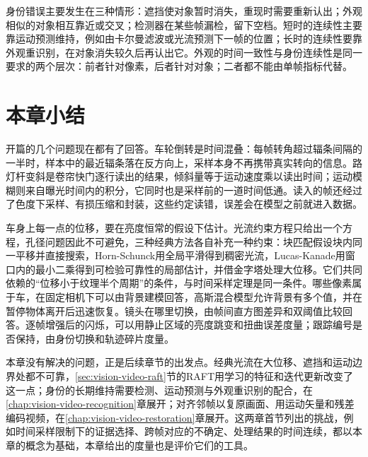身份错误主要发生在三种情形：遮挡使对象暂时消失，重现时需要重新认出；外观相似的对象相互靠近或交叉；检测器在某些帧漏检，留下空档。短时的连续性主要靠运动预测维持，例如由卡尔曼滤波或光流预测下一帧的位置；长时的连续性要靠外观重识别，在对象消失较久后再认出它。外观的时间一致性与身份连续性是同一要求的两个层次：前者针对像素，后者针对对象；二者都不能由单帧指标代替。

\section{本章小结}
\label{sec:vision-videofound-summary}

开篇的几个问题现在都有了回答。车轮倒转是时间混叠：每帧转角超过辐条间隔的一半时，样本中的最近辐条落在反方向上，采样本身不再携带真实转向的信息。路灯杆变斜是卷帘快门逐行读出的结果，倾斜量等于运动速度乘以读出时间；运动模糊则来自曝光时间内的积分，它同时也是采样前的一道时间低通。读入的帧还经过了色度下采样、有损压缩和封装，这些约定读错，误差会在模型之前就进入数据。

车身上每一点的位移，要在亮度恒常的假设下估计。光流约束方程只给出一个方程，孔径问题因此不可避免，三种经典方法各自补充一种约束：块匹配假设块内同一平移并直接搜索，Horn-Schunck用全局平滑得到稠密光流，Lucas-Kanade用窗口内的最小二乘得到可检验可靠性的局部估计，并借金字塔处理大位移。它们共同依赖的“位移小于纹理半个周期”的条件，与时间采样定理是同一条件。哪些像素属于车，在固定相机下可以由背景建模回答，高斯混合模型允许背景有多个值，并在暂停物体离开后迅速恢复。镜头在哪里切换，由帧间直方图差异和双阈值比较回答。逐帧增强后的闪烁，可以用静止区域的亮度跳变和扭曲误差度量；跟踪编号是否保持，由身份切换和轨迹碎片度量。

本章没有解决的问题，正是后续章节的出发点。经典光流在大位移、遮挡和运动边界处都不可靠，\ref{sec:vision-video-raft}节的RAFT用学习的特征和迭代更新改变了这一点；身份的长期维持需要检测、运动预测与外观重识别的配合，在\ref{chap:vision-video-recognition}章展开；对齐邻帧以复原画面、用运动矢量和残差编码视频，在\ref{chap:vision-video-restoration}章展开。这两章首节列出的挑战，例如时间采样限制下的证据选择、跨帧对应的不确定、处理结果的时间连续，都以本章的概念为基础，本章给出的度量也是评价它们的工具。

